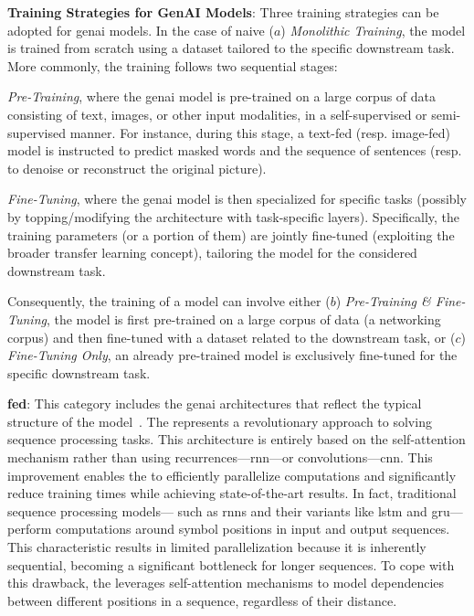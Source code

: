 \vspace{5pt}
\noindent
\textbf{Training Strategies for GenAI Models}:
Three training strategies can be adopted for \gls{genai} models.
In the case of naive ($a$) \emph{Monolithic Training}, the model is trained from scratch using a dataset tailored to the specific downstream task.
More commonly, the training follows two sequential stages:
\begin{enumerate*}[label=(\emph{\roman*})]
    \item \emph{Pre-Training}, where the \gls{genai} model is pre-trained on a large corpus of data consisting of text, images, or other input modalities, in a self-supervised or semi-supervised manner. 
    For instance, during this stage, a text-fed (resp. image-fed) model is instructed to predict masked words and the sequence of sentences (resp. to denoise or reconstruct the original picture).
    \item \emph{Fine-Tuning}, where the \gls{genai} model is then specialized for specific tasks (possibly by topping/modifying the architecture with task-specific layers). Specifically, the training parameters (or a portion of them) are jointly fine-tuned (exploiting the broader transfer learning concept), tailoring the model for the considered downstream task.
\end{enumerate*}
Consequently, the training of a model can involve either ($b$) \emph{Pre-Training \& Fine-Tuning}, \ie the model is first pre-trained on a large corpus of data (\eg a networking corpus) and then fine-tuned with a dataset related to the downstream task, or ($c$) \emph{Fine-Tuning Only}, \ie an already pre-trained model is exclusively fine-tuned for the specific downstream task.


%


\vspace{5pt}
\noindent
\textbf{\gls{fed}}:
This category includes the \gls{genai} architectures that reflect the typical structure of the  model~\cite{vaswani2017attention}.
The  represents a revolutionary approach to solving sequence processing tasks. This architecture is entirely based on the self-attention mechanism rather than using recurrences---\eg \gls{rnn}---or convolutions---\eg \gls{cnn}.
This improvement enables the  to efficiently parallelize computations and significantly reduce training times while achieving state-of-the-art results.
In fact, traditional sequence processing models---%
such as \glspl{rnn} and their variants like \gls{lstm} and \gls{gru}---%
perform computations around symbol positions in input and output sequences.
This characteristic results in limited parallelization because it is inherently sequential, 
%
becoming a significant bottleneck for longer sequences.
%
To cope with this drawback, the  leverages self-attention mechanisms to model dependencies between different positions in a sequence, regardless of their distance.

